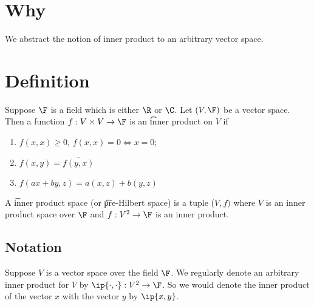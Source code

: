 
\section*{Why}

We abstract the notion of inner product to an arbitrary vector space.

\section*{Definition}

Suppose $\F $ is a field which is either $\R $ or $\C $. Let $(V, \F )$ be a vector space.
Then a function $f: V \times  V \to \F $ is an \t{inner product} on $V$ if
    \begin{enumerate}
      \item $f(x, x) \geq 0$, $f(x, x) = 0 \Leftrightarrow x = 0$;
      \item $f(x, y) = \overline{f(y, x)}$
      \item $f(ax + by, z) = a(x, z) + b(y, z)$
    \end{enumerate}
A \t{inner product space} (or \t{pre-Hilbert space}) is a tuple ($V, f)$ where $V$ is an inner product space over $\F $ and $f: V^2 \to \F $ is an inner product.

\subsection*{Notation}

Suppose $V$ is a vector space over the field $\F $.
We regularly denote an arbitrary inner product for $V$ by $\ip{\cdot ,\cdot }: V^2 \to \F $.
So we would denote the inner product of the vector $x$ with the vector $y$ by $\ip{x, y}$.

\blankpage